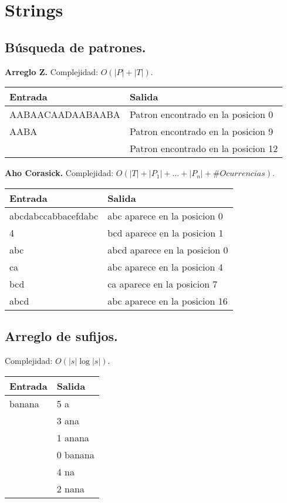 \documentclass[10pt, letterpaper, twoside]{article}
\begin{document}

\section{Strings}

\subsection{Búsqueda de patrones.}

\textbf{Arreglo Z.} Complejidad: $O(|P| + |T|)$.



\begin{tabular}{|p{7cm}|p{7cm}|}
\hline
\textbf{Entrada} & \textbf{Salida}\\ \hline
AABAACAADAABAABA & Patron encontrado en la posicion 0\\
AABA             & Patron encontrado en la posicion 9\\
                 & Patron encontrado en la posicion 12\\ \hline
\end{tabular}\bigskip

\textbf{Aho Corasick.} Complejidad: $O(|T| + |P_1| + \ldots + |P_n| + \#Ocurrencias)$.



\begin{tabular}{|p{7cm}|p{7cm}|}
\hline
\textbf{Entrada} & \textbf{Salida}\\ \hline
abcdabccabbacefdabc & abc aparece en la posicion 0\\
4                   & bcd aparece en la posicion 1\\
abc                 & abcd aparece en la posicion 0\\
ca                  & abc aparece en la posicion 4\\
bcd                 & ca aparece en la posicion 7\\
abcd                & abc aparece en la posicion 16\\ \hline
\end{tabular}

\subsection{Arreglo de sufijos.}

Complejidad: $O(|s|\log |s|)$.



\begin{tabular}{|p{7cm}|p{7cm}|}
\hline
\textbf{Entrada} & \textbf{Salida}\\ \hline
banana & 5 a\\
& 3 ana\\
& 1 anana\\
& 0 banana\\
& 4 na\\
& 2 nana\\ \hline
\end{tabular}

\end{document}
